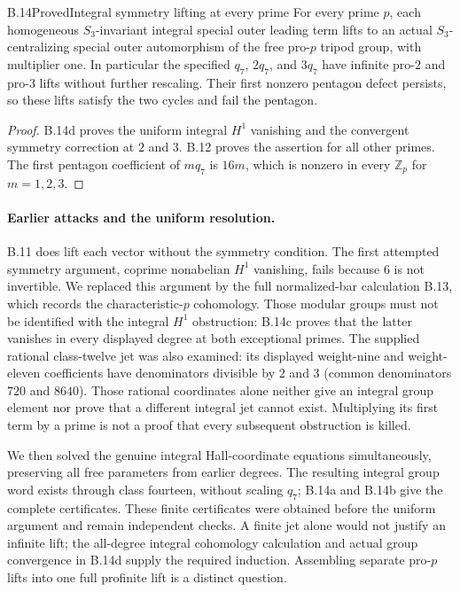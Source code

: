 \begin{statement}{B.14}{Proved}{Integral symmetry lifting at every prime}
For every prime $p$, each homogeneous $S_3$-invariant
integral special outer leading term lifts to an actual
$S_3$-centralizing special outer automorphism of the free
pro-$p$ tripod group, with multiplier one. In particular
the specified $q_7$, $2q_7$, and $3q_7$ have infinite
pro-$2$ and pro-$3$ lifts without further rescaling.
Their first nonzero pentagon defect persists, so these
lifts satisfy the two cycles and fail the pentagon.
\end{statement}
\begin{proof}
B.14d proves the uniform integral $H^1$ vanishing and
the convergent symmetry correction at $2$ and $3$.
B.12 proves the assertion for all other primes.
The first pentagon coefficient of $m q_7$ is $16m$,
which is nonzero in every $\mathbb Z_p$ for $m=1,2,3$.
\end{proof}
\paragraph{Earlier attacks and the uniform resolution.}
B.11 does lift each vector without the symmetry condition.
The first attempted symmetry argument, coprime
nonabelian $H^1$ vanishing, fails because $6$ is not
invertible. We replaced this argument by the full
normalized-bar calculation B.13, which records the
characteristic-$p$ cohomology. Those modular groups must
not be identified with the integral $H^1$ obstruction:
B.14c proves that the latter vanishes in every displayed
degree at both exceptional primes. The supplied rational class-twelve jet was also
examined: its displayed weight-nine and weight-eleven
coefficients have denominators divisible by $2$ and
$3$ (common denominators $720$ and $8640$).
Those rational coordinates alone neither give an
integral group element nor prove that a different
integral jet cannot exist. Multiplying its first
term by a prime is not a proof that every subsequent
obstruction is killed.

We then solved the genuine integral Hall-coordinate
equations simultaneously, preserving all free parameters
from earlier degrees. The resulting integral group word
exists through class fourteen, without scaling $q_7$;
B.14a and B.14b give the complete certificates.
These finite certificates were obtained before the
uniform argument and remain independent checks.
A finite jet alone would not justify an infinite lift;
the all-degree integral cohomology calculation and
actual group convergence in B.14d supply the required
induction. Assembling separate pro-$p$ lifts into one
full profinite lift is a distinct question.

